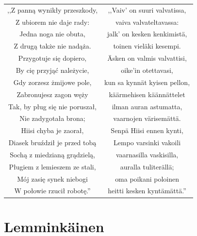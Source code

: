 \documentclass[11pt,a4paper,twoside]{report}
\begin{document}
{\centering
\small
\begin{longtable}{c c}
,,Z panną wynikły przeszkody, & ,,Vaiv' on suuri valvatissa, \\
Z ubiorem nie daje rady: & vaiva valvateltavassa: \\
Jedna noga nie obuta, & jalk' on kesken kenkimistä, \\
Z drugą także nie nadąża. & toinen vieläki kesempi. \\
Przygotuje się dopiero, & Äsken on valmis valvattisi, \\
By cię przyjąć należycie, & oike'in otettavasi, \\
Gdy zorzesz żmijowe pole, & kun sa kynnät kyisen pellon, \\
Zabronujesz zagon węży & käärmehisen käännättelet \\
Tak, by pług się nie poruszał, & ilman auran astumatta, \\
Nie zadygotała brona; & vaarnojen värisemättä. \\
Hiisi chyba je zaorał, & Senpä Hiisi ennen kynti, \\
Diasek bruździł je przed tobą & Lempo varsinki vakoili \\
Sochą z miedzianą grądzielą, & vaarnasilla vaskisilla, \\
Pługiem z lemieszem ze stali, & auralla tuliterällä; \\
Mój zasię synek niebogi & oma poikani poloinen \\
W połowie rzucił robotę.'' & heitti kesken kyntämättä.'' \\
\end{longtable}
}
\vspace*{\baselineskip}
\section{Lemminkäinen}
\vspace*{0.5\baselineskip}
\end{document}
